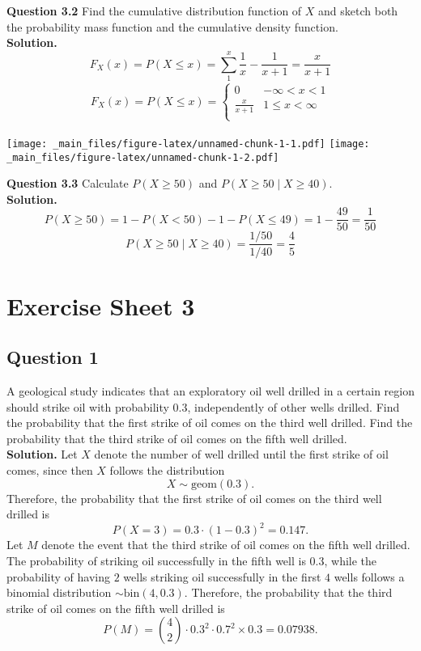 \documentclass[
]{book}
\begin{document}
\textbf{Question 3.2} Find the cumulative distribution function of \(X\) and sketch both the probability mass function and the cumulative density function.\\
\textbf{Solution.} \[F_X(x) = P(X \leq x) = \sum_{1}^{x} \frac{1}{x} - \frac{1}{x+1} = \frac{x}{x+1}\] \[\begin{aligned}
           F_X(x) = P(X \leq x) = 
           \begin{cases}
        0   &   -\infty < x < 1 \\
        \frac{x}{x+1}   &   1 \leq x < \infty \\
           \end{cases}
         \end{aligned}\]

\texttt{[image: \_main\_files/figure-latex/unnamed-chunk-1-1.pdf]} \texttt{[image: \_main\_files/figure-latex/unnamed-chunk-1-2.pdf]}

\textbf{Question 3.3} Calculate \(P(X \geq 50)\) and \(P(X \geq 50 \mid X \geq 40)\).\\
\textbf{Solution.}
\[P(X \geq 50) = 1 - P(X < 50) - 1 - P(X \leq 49) = 1 - \frac{49}{50} = \frac{1}{50}\]
\[P(X \geq 50 \mid X \geq 40) = \frac{1/50}{1/40} = \frac{4}{5}\]

\chapter{Exercise Sheet 3}\label{exercise-sheet-3}

\section{Question 1}\label{question-1-2}

A geological study indicates that an exploratory oil well drilled in a certain region should strike oil with probability \(0.3\), independently of other wells drilled. Find the probability that the first strike of oil comes on the third well drilled. Find the probability that the third strike of oil comes on the fifth well drilled.\\
\textbf{Solution.} Let \(X\) denote the number of well drilled until the first strike of oil comes, since then \(X\) follows the distribution \[X \sim \text{geom}(0.3).\] Therefore, the probability that the first strike of oil comes on the third well drilled is \[P(X = 3) = 0.3 \cdot (1-0.3)^2 = 0.147.\]
Let \(M\) denote the event that the third strike of oil comes on the fifth well drilled. The probability of striking oil successfully in the fifth well is \(0.3\), while the probability of having \(2\) wells striking oil successfully in the first \(4\) wells follows a binomial distribution \(\sim \text{bin}(4,0.3)\). Therefore, the probability that the third strike of oil comes on the fifth well drilled is
\[P(M) = \binom{4}{2} \cdot 0.3^2 \cdot 0.7^2 \times 0.3 = 0.07938.\]
\end{document}
